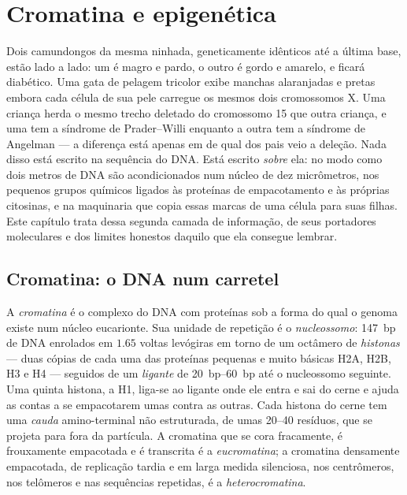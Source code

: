 \chapter{Cromatina e epigenética}\label{ch:b3:chromatin-epigenetics}

Dois camundongos da mesma ninhada, geneticamente idênticos até a
última base, estão lado a lado: um é magro e pardo, o outro é gordo e
amarelo, e ficará diabético. Uma gata de pelagem tricolor exibe
manchas alaranjadas e pretas embora cada célula de sua pele carregue
os mesmos dois cromossomos X. Uma criança herda o mesmo trecho
deletado do cromossomo 15 que outra criança, e uma tem a síndrome de
Prader--Willi enquanto a outra tem a síndrome de Angelman --- a
diferença está apenas em de qual dos pais veio a deleção. Nada disso
está escrito na sequência do DNA. Está escrito \emph{sobre} ela: no
modo como dois metros de DNA são acondicionados num núcleo de dez
micrômetros, nos pequenos grupos químicos ligados às proteínas de
empacotamento e às próprias citosinas, e na maquinaria que copia essas
marcas de uma célula para suas filhas. Este capítulo trata dessa
segunda camada de informação, de seus portadores moleculares e dos
limites honestos daquilo que ela consegue lembrar.

\section{Cromatina: o DNA num carretel}

\begin{definition}\label{def:b3:chromatin-epigenetics:nucleosome}
A \emph{cromatina} é o complexo do DNA com proteínas sob a forma do
qual o genoma existe num núcleo eucarionte. Sua unidade de repetição é
o \emph{nucleossomo}: \qty{147}{bp} de DNA enrolados em $1.65$ voltas
levógiras em torno de um octâmero de \emph{histonas} --- duas cópias
de cada uma das proteínas pequenas e muito básicas H2A, H2B, H3 e H4
--- seguidos de um \emph{ligante} de \qtyrange{20}{60}{bp} até o
nucleossomo seguinte. Uma quinta histona, a H1, liga-se ao ligante
onde ele entra e sai do cerne e ajuda as contas a se empacotarem umas
contra as outras. Cada histona do cerne tem uma \emph{cauda}
amino-terminal não estruturada, de umas \numrange{20}{40} resíduos,
que se projeta para fora da partícula. A cromatina que se cora
fracamente, é frouxamente empacotada e é transcrita é a
\emph{eucromatina}; a cromatina densamente empacotada, de replicação
tardia e em larga medida silenciosa, nos centrômeros, nos telômeros e
nas sequências repetidas, é a \emph{heterocromatina}.
\end{definition}

